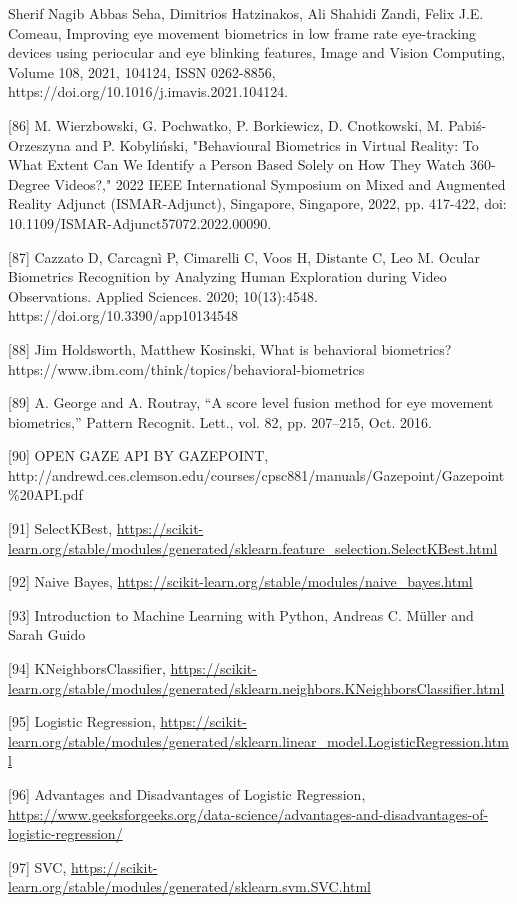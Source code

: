 \documentclass{article}
\begin{document}
\begin{raggedright}
[85] Sherif Nagib Abbas Seha, Dimitrios Hatzinakos, Ali Shahidi Zandi, Felix J.E. Comeau, Improving eye movement biometrics in low frame rate eye-tracking devices using periocular and eye blinking features, Image and Vision Computing, Volume 108, 2021, 104124, ISSN 0262-8856, https://doi.org/10.1016/j.imavis.2021.104124.

[86] M. Wierzbowski, G. Pochwatko, P. Borkiewicz, D. Cnotkowski, M. Pabiś-Orzeszyna and P. Kobyliński, "Behavioural Biometrics in Virtual Reality: To What Extent Can We Identify a Person Based Solely on How They Watch 360-Degree Videos?," 2022 IEEE International Symposium on Mixed and Augmented Reality Adjunct (ISMAR-Adjunct), Singapore, Singapore, 2022, pp. 417-422, doi: 10.1109/ISMAR-Adjunct57072.2022.00090.

[87] Cazzato D, Carcagnì P, Cimarelli C, Voos H, Distante C, Leo M. Ocular Biometrics Recognition by Analyzing Human Exploration during Video Observations. Applied Sciences. 2020; 10(13):4548. https://doi.org/10.3390/app10134548

[88] Jim Holdsworth, Matthew Kosinski, What is behavioral biometrics? https://www.ibm.com/think/topics/behavioral-biometrics

[89] A. George and A. Routray, “A score level fusion method for eye movement biometrics,” Pattern Recognit. Lett., vol. 82, pp. 207–215, Oct. 2016.

[90] OPEN GAZE API BY GAZEPOINT, http://andrewd.ces.clemson.edu/courses/cpsc881/manuals/Gazepoint/Gazepoint\%20API.pdf

[91] SelectKBest, \url{https://scikit-learn.org/stable/modules/generated/sklearn.feature_selection.SelectKBest.html}

[92] Naive Bayes, \url{https://scikit-learn.org/stable/modules/naive_bayes.html}

[93] Introduction to Machine Learning with Python, Andreas C. Müller and Sarah Guido

[94] KNeighborsClassifier, \url{https://scikit-learn.org/stable/modules/generated/sklearn.neighbors.KNeighborsClassifier.html}

[95] Logistic Regression, \url{https://scikit-learn.org/stable/modules/generated/sklearn.linear_model.LogisticRegression.html}

[96] Advantages and Disadvantages of Logistic Regression, \url{https://www.geeksforgeeks.org/data-science/advantages-and-disadvantages-of-logistic-regression/}

[97] SVC, \url{https://scikit-learn.org/stable/modules/generated/sklearn.svm.SVC.html}


\end{raggedright}
\end{document}
